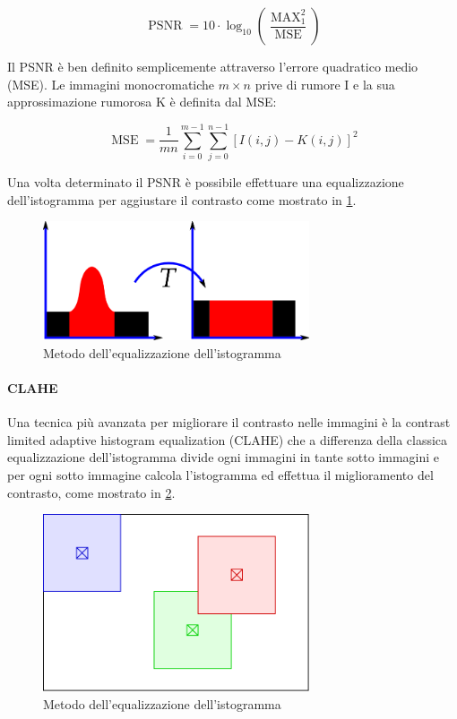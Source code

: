 \[ \operatorname{PSNR}=10 \cdot \log _{10}\left(\frac{\operatorname{MAX}_{1}^{2}}{\operatorname{MSE}}\right) \]

Il PSNR è ben definito semplicemente attraverso l'errore quadratico medio (MSE).
Le immagini monocromatiche \(m\times n\) prive di rumore I e la sua approssimazione rumorosa K è definita dal MSE:

\[ \operatorname{MSE}=\frac{1}{m n} \sum_{i=0}^{m-1} \sum_{j=0}^{n-1}[I(i, j)-K(i, j)]^{2} \]

Una volta determinato il PSNR è possibile effettuare una equalizzazione dell'istogramma per aggiustare il contrasto come mostrato in \cref{fig:histogram}\cite{pandey_contrast}\cite{permual_contrast}\cite{hummel_histogram}.

\begin{figure}[ht]
    \centering
    \includegraphics[width=0.7\textwidth]{preprocessing/histogram.png}
    \caption{Metodo dell'equalizzazione dell'istogramma}
    \label{fig:histogram}
\end{figure}

\paragraph{CLAHE}\label{clahe}

Una tecnica più avanzata per migliorare il contrasto nelle immagini è la contrast limited adaptive histogram equalization (CLAHE) che a differenza della classica equalizzazione dell'istogramma divide ogni immagini in tante sotto immagini e per ogni sotto immagine calcola l'istogramma ed effettua il miglioramento del contrasto, come mostrato in \cref{fig:clahe}\cite{hummel_histogram}.


\begin{figure}[ht]
    \centering
    \includegraphics[width=0.7\textwidth]{preprocessing/clahe.pdf}
    \caption{Metodo dell'equalizzazione dell'istogramma}
    \label{fig:clahe}
\end{figure}

